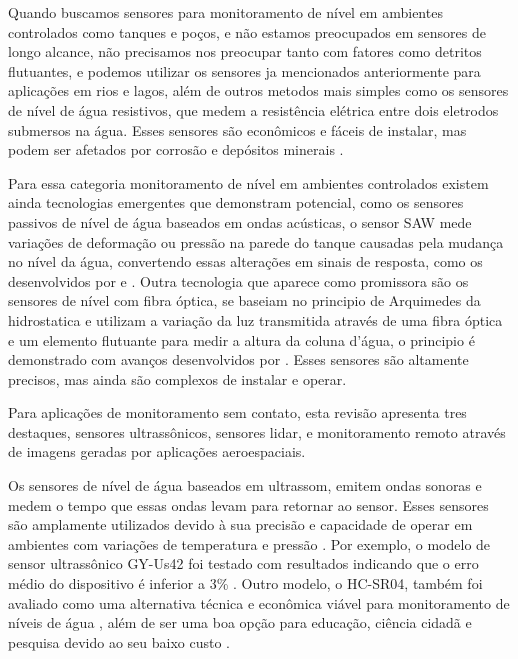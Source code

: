 Quando buscamos sensores para monitoramento de nível em ambientes controlados como tanques e poços, e não estamos preocupados em sensores de longo alcance, não precisamos nos preocupar tanto com fatores como detritos flutuantes, e podemos utilizar os sensores ja mencionados anteriormente para aplicações em rios e lagos, além de outros metodos mais simples como os sensores de nível de água resistivos, que medem a resistência elétrica entre dois eletrodos submersos na água. Esses sensores são econômicos e fáceis de instalar, mas podem ser afetados por corrosão e depósitos minerais \cite{santana_2024_development, mohindru_2023_development}.

Para essa categoria  monitoramento de nível em ambientes controlados existem ainda tecnologias emergentes que demonstram potencial, como os sensores passivos de nível de água baseados em ondas acústicas, o sensor SAW mede variações de deformação ou pressão na parede do tanque causadas pela mudança no nível da água, convertendo essas alterações em sinais de resposta, como os desenvolvidos por \textcite{ali_2020_saw} e \textcite{sreejith_2024_modeling}. Outra tecnologia que aparece como promissora são os sensores de nível com fibra óptica, se baseiam no principio de Arquimedes da hidrostatica e utilizam a variação da luz transmitida através de uma fibra óptica e um elemento flutuante para medir a altura da coluna d'água, o principio é demonstrado com avanços desenvolvidos por \textcite{ramos_2025_high}. Esses sensores são altamente precisos, mas ainda são complexos de instalar e operar.

Para aplicações de monitoramento sem contato, esta revisão apresenta tres destaques, sensores ultrassônicos, sensores lidar, e monitoramento remoto através de imagens geradas por aplicações aeroespaciais.

Os sensores de nível de água baseados em ultrassom, emitem ondas sonoras e medem o tempo que essas ondas levam para retornar ao sensor. Esses sensores são amplamente utilizados devido à sua precisão e capacidade de operar em ambientes com variações de temperatura e pressão \cite{mohammadrezamasoudimoghaddam_2024_a, pereira_2022_evaluation}. Por exemplo, o modelo de sensor ultrassônico GY-Us42 foi testado com resultados indicando que o erro médio do dispositivo é inferior a 3\% \cite{mohammadrezamasoudimoghaddam_2024_a}. Outro modelo, o HC-SR04, também foi avaliado como uma alternativa técnica e econômica viável para monitoramento de níveis de água \cite{pereira_2022_evaluation}, além de ser uma boa opção para educação, ciência cidadã e pesquisa devido ao seu baixo custo \cite{bresnahan_2023_a}.

